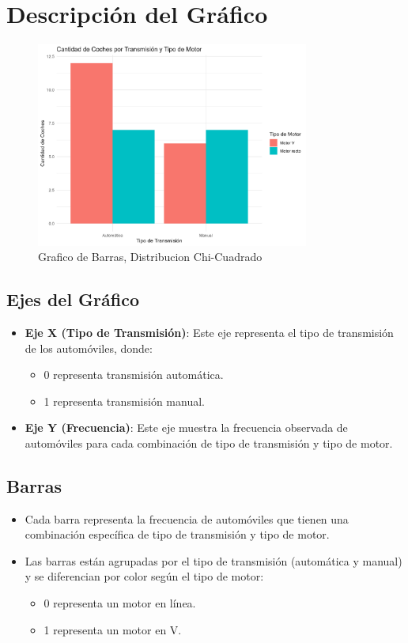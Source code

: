 \documentclass{article}
\begin{document}
\section{Descripción del Gráfico}
\begin{figure}[H] %
	\centering %
	\includegraphics[width=0.8\textwidth]{mtcars_transmision_motor.png}
	\caption{Grafico de Barras, Distribucion Chi-Cuadrado} %
	\label{fig:mi_imagen} %
\end{figure}

\subsection{Ejes del Gráfico}
\begin{itemize}
	\item \textbf{Eje X (Tipo de Transmisión)}: Este eje representa el tipo de transmisión de los automóviles, donde:
	      \begin{itemize}
		      \item 0 representa transmisión automática.
		      \item 1 representa transmisión manual.
	      \end{itemize}
	\item \textbf{Eje Y (Frecuencia)}: Este eje muestra la frecuencia observada de automóviles para cada combinación de tipo de transmisión y tipo de motor.
\end{itemize}

\subsection{Barras}
\begin{itemize}
	\item Cada barra representa la frecuencia de automóviles que tienen una combinación específica de tipo de transmisión y tipo de motor.
	\item Las barras están agrupadas por el tipo de transmisión (automática y manual) y se diferencian por color según el tipo de motor:
	      \begin{itemize}
		      \item 0 representa un motor en línea.
		      \item 1 representa un motor en V.
	      \end{itemize}
\end{itemize}
\end{document}
